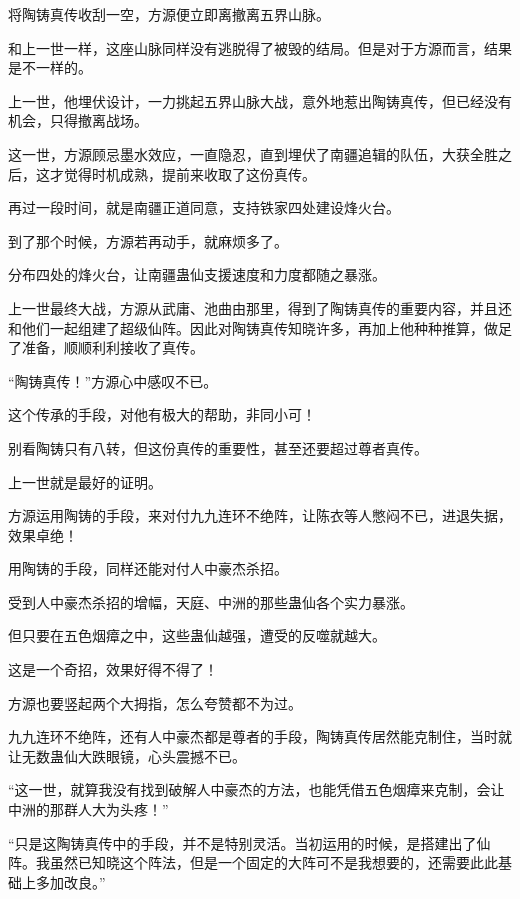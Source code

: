 
\begin{this_body}

将陶铸真传收刮一空，方源便立即离撤离五界山脉。

和上一世一样，这座山脉同样没有逃脱得了被毁的结局。但是对于方源而言，结果是不一样的。

上一世，他埋伏设计，一力挑起五界山脉大战，意外地惹出陶铸真传，但已经没有机会，只得撤离战场。

这一世，方源顾忌墨水效应，一直隐忍，直到埋伏了南疆追辑的队伍，大获全胜之后，这才觉得时机成熟，提前来收取了这份真传。

再过一段时间，就是南疆正道同意，支持铁家四处建设烽火台。

到了那个时候，方源若再动手，就麻烦多了。

分布四处的烽火台，让南疆蛊仙支援速度和力度都随之暴涨。

上一世最终大战，方源从武庸、池曲由那里，得到了陶铸真传的重要内容，并且还和他们一起组建了超级仙阵。因此对陶铸真传知晓许多，再加上他种种推算，做足了准备，顺顺利利接收了真传。

“陶铸真传！”方源心中感叹不已。

这个传承的手段，对他有极大的帮助，非同小可！

别看陶铸只有八转，但这份真传的重要性，甚至还要超过尊者真传。

上一世就是最好的证明。

方源运用陶铸的手段，来对付九九连环不绝阵，让陈衣等人憋闷不已，进退失据，效果卓绝！

用陶铸的手段，同样还能对付人中豪杰杀招。

受到人中豪杰杀招的增幅，天庭、中洲的那些蛊仙各个实力暴涨。

但只要在五色烟瘴之中，这些蛊仙越强，遭受的反噬就越大。

这是一个奇招，效果好得不得了！

方源也要竖起两个大拇指，怎么夸赞都不为过。

九九连环不绝阵，还有人中豪杰都是尊者的手段，陶铸真传居然能克制住，当时就让无数蛊仙大跌眼镜，心头震撼不已。

“这一世，就算我没有找到破解人中豪杰的方法，也能凭借五色烟瘴来克制，会让中洲的那群人大为头疼！”

“只是这陶铸真传中的手段，并不是特别灵活。当初运用的时候，是搭建出了仙阵。我虽然已知晓这个阵法，但是一个固定的大阵可不是我想要的，还需要此此基础上多加改良。”


\end{this_body}
